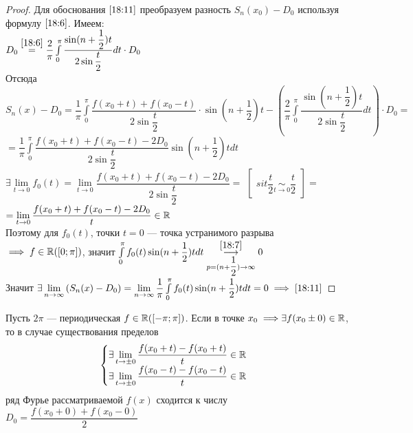 \documentclass[../../main.tex]{subfiles}
\begin{document}
\begin{proof}
	Для обоснования $\eqref{18:11}$ преобразуем разность 
	$S_n(x_0) - D_0$ используя формулу $\eqref{18:6}$. Имеем:\\
	$D_0 \stackrel{\eqref{18:6}}{=} \dfrac{2}{\pi}
	\int\limits_{0}^{\pi}{\dfrac{\sin(n+\dfrac{1}{2})t}{2\sin\dfrac{t}{2}}
	dt} \cdot D_0$\\
	Отсюда \\
	$S_n(x) - D_0 = \dfrac{1}{\pi}\int\limits_{0}^{\pi}
	{\dfrac{f(x_0 + t) + f(x_0 - t)}{2\sin\dfrac{t}{2}}} \cdot 
	\sin(n + \dfrac{1}{2})t - (\dfrac{2}{\pi}\int\limits_{0}^{\pi}
	\dfrac{\sin(n + \dfrac{1}{2})t}{2\sin\dfrac{t}{2}}dt)\cdot D_0 =$\\
	$= \dfrac{1}{\pi}\int\limits_{0}^{\pi}{\dfrac{f(x_0 + t) +
		f(x_0 - t) - 2D_0}{2\sin\dfrac{t}{2}}}\sin(n + \dfrac{1}{2})tdt$\\
	$\exists \lim\limits_{t \rightarrow 0}{f_0(t)} = 
	\lim\limits_{t \rightarrow 0}{\dfrac{f(x_0 + t) + f(x_0 - t) - 2D_0}
		{2\sin\dfrac{t}{2}}} =$
	$\left[ 
	\begin{gathered} 
	sit\dfrac{t}{2} \underset {t \rightarrow 0}{\sim} \dfrac{t}{2} 
	\end{gathered} 
	\right]  =$\\
	$=\lim\limits_{t \rightarrow 0}{\dfrac{f(x_0 + t) + f(x_0 - t)-
		2D_0}t} \in \mathbb{R}$\\
	Поэтому для $f_0(t)$, точки $t = 0$ --- точка устранимого разрыва 
	$\implies f \in \mathbb{R}([0; \pi])$, значит 
	$\int\limits_{0}^{\pi}{f_0(t)\sin(n+\dfrac{1}{2})tdt} 
	\overset{\eqref{18:7}}{\underset
		{p=(n+\dfrac{1}{2}) \rightarrow \infty}{\longrightarrow}} 0$\\
	Значит $\exists \lim\limits_{n \rightarrow \infty}{(
		S_n(x) - D_0)} = \lim\limits_{n\rightarrow \infty}
	{\dfrac{1}{\pi}}\int\limits_{0}^{\pi}{f_0(t)\sin(n+\dfrac{1}{2})tdt} = 0
	\implies \eqref{18:11}$
\end{proof}

\begin{crl*}
	Пусть $2\pi$ --- периодическая $f\in \mathbb{R}([-\pi;\pi])$.
	Если в точке $x_0 \implies \\ \exists f(x_0 \pm 0) \in \mathbb{R}$, то в
	случае существования пределов
	\begin{equation}
		\label{18:12}
		\begin{cases}
			\exists \lim\limits_{t \rightarrow \pm 0}{\dfrac
				{f(x_0 + t) - f(x_0 + t)}{t}} \in \mathbb{R}\\
			\exists \lim\limits_{t \rightarrow \pm 0}{\dfrac
				{f(x_0 - t) - f(x_0 - t)}{t}} \in \mathbb{R}\\ 
		\end{cases}
	\end{equation}
	ряд Фурье рассматриваемой $f(x)$ сходится к числу
	$D_0 = \dfrac{f(x_0 + 0) + f(x_0 - 0)}{2}$ 
	
\end{crl*}
\end{document}
